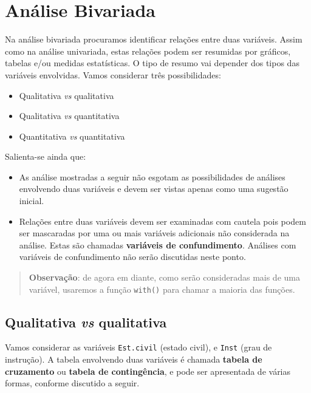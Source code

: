 \documentclass[
  10pt,
  a4paper]{book}
\providecommand{\tightlist}{%
  \setlength{\itemsep}{0pt}\setlength{\parskip}{0pt}}
\begin{document}
\hypertarget{anuxe1lise-bivariada}{%
\section{Análise Bivariada}\label{anuxe1lise-bivariada}}

Na análise bivariada procuramos identificar relações entre duas variáveis.
Assim como na análise univariada, estas relações podem ser resumidas por
gráficos, tabelas e/ou medidas estatísticas.
O tipo de resumo vai depender dos tipos das variáveis envolvidas.
Vamos considerar três possibilidades:

\begin{itemize}
\tightlist
\item
  Qualitativa \emph{vs} qualitativa
\item
  Qualitativa \emph{vs} quantitativa
\item
  Quantitativa \emph{vs} quantitativa
\end{itemize}

Salienta-se ainda que:

\begin{itemize}
\tightlist
\item
  As análise mostradas a seguir não esgotam as possibilidades de
  análises envolvendo duas variáveis e devem ser vistas apenas como uma
  sugestão inicial.
\item
  Relações entre duas variáveis devem ser examinadas com cautela pois
  podem ser mascaradas por uma ou mais variáveis adicionais não
  considerada na análise. Estas são chamadas \textbf{variáveis de
  confundimento}. Análises com variáveis de confundimento não serão
  discutidas neste ponto.
\end{itemize}

\begin{quote}
\textbf{Observação}: de agora em diante, como serão consideradas mais de
uma variável, usaremos a função \texttt{with()} para chamar a maioria das
funções.
\end{quote}

\hypertarget{qualitativa-vs-qualitativa}{%
\subsection{\texorpdfstring{Qualitativa \emph{vs} qualitativa}{Qualitativa vs qualitativa}}\label{qualitativa-vs-qualitativa}}

Vamos considerar as variáveis \texttt{Est.civil} (estado civil), e \texttt{Inst} (grau
de instrução). A tabela envolvendo duas variáveis é chamada \textbf{tabela de
cruzamento} ou \textbf{tabela de contingência}, e pode ser apresentada de
várias formas, conforme discutido a seguir.
\end{document}
